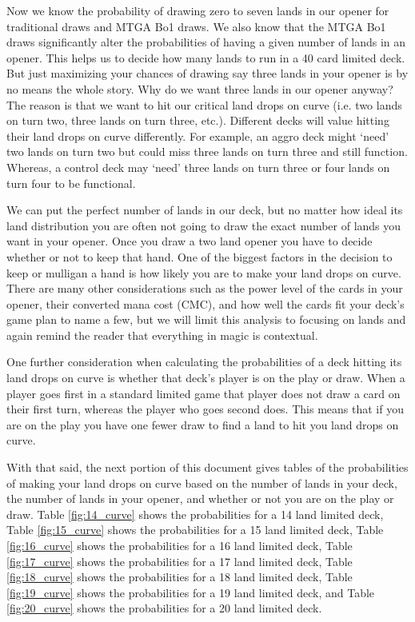 \documentclass[oneside]{book}   %
\begin{document}
Now we know the probability of drawing zero to seven lands in our opener for traditional draws and MTGA Bo1 draws. We also know that the MTGA Bo1 draws significantly alter the probabilities of having a given number of lands in an opener. This helps us to decide how many lands to run in a 40 card limited deck. But just maximizing your chances of drawing say three lands in your opener is by no means the whole story. Why do we want three lands in our opener anyway? The reason is that we want to hit our critical land drops on curve (i.e. two lands on turn two, three lands on turn three, etc.). Different decks will value hitting their land drops on curve differently. For example, an aggro deck might `need' two lands on turn two but could miss three lands on turn three and still function. Whereas, a control deck may `need' three lands on turn three or four lands on turn four to be functional. 

We can put the perfect number of lands in our deck, but no matter how ideal its land distribution you are often not going to draw the exact number of lands you want in your opener. Once you draw a two land opener you have to decide whether or not to keep that hand. One of the biggest factors in the decision to keep or mulligan a hand is how likely you are to make your land drops on curve. There are many other considerations such as the power level of the cards in your opener, their converted mana cost (CMC), and how well the cards fit your deck's game plan to name a few, but we will limit this analysis to focusing on lands and again remind the reader that everything in magic is contextual.

One further consideration when calculating the probabilities of a deck hitting its land drops on curve is whether that deck's player is on the play or draw. When a player goes first in a standard limited game that player does not draw a card on their first turn, whereas the player who goes second does. This means that if you are on the play you have one fewer draw to find a land to hit you land drops on curve. 

With that said, the next portion of this document gives tables of the probabilities of making your land drops on curve based on the number of lands in your deck, the number of lands in your opener, and whether or not you are on the play or draw. Table \ref{fig:14_curve} shows the probabilities for a 14 land limited deck, Table \ref{fig:15_curve} shows the probabilities for a 15 land limited deck, Table \ref{fig:16_curve} shows the probabilities for a 16 land limited deck, Table \ref{fig:17_curve} shows the probabilities for a 17 land limited deck, Table \ref{fig:18_curve} shows the probabilities for a 18 land limited deck, Table \ref{fig:19_curve} shows the probabilities for a 19 land limited deck, and Table \ref{fig:20_curve} shows the probabilities for a 20 land limited deck. 
\end{document}

